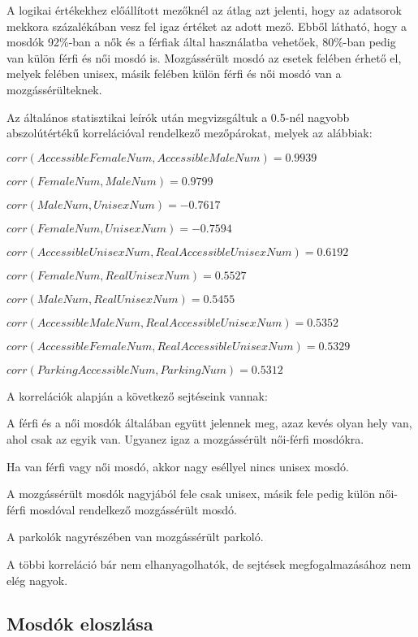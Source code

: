 	A logikai értékekhez előállított mezőknél az átlag azt jelenti, hogy az adatsorok mekkora százalékában vesz fel igaz értéket az adott mező. Ebből látható, hogy a mosdók 92\%-ban a nők és a férfiak által használatba vehetőek, 80\%-ban pedig van külön férfi és női mosdó is. Mozgássérült mosdó az esetek felében érhető el, melyek felében unisex, másik felében külön férfi és női mosdó van a mozgássérülteknek.\par	
	Az általános statisztikai leírók után megvizsgáltuk a 0.5-nél nagyobb abszolútértékű korrelációval rendelkező mezőpárokat, melyek az alábbiak:
	\begin{compactlist}			
		\item $corr(AccessibleFemaleNum, AccessibleMaleNum) = 0.9939$
		\item $corr(FemaleNum, MaleNum) = 0.9799$
		\item $corr(MaleNum, UnisexNum) = -0.7617$
		\item $corr(FemaleNum, UnisexNum) = -0.7594$
		\item $corr(AccessibleUnisexNum, RealAccessibleUnisexNum) = 0.6192$
		\item $corr(FemaleNum, RealUnisexNum) = 0.5527$
		\item $corr(MaleNum, RealUnisexNum) = 0.5455$
		\item $corr(AccessibleMaleNum, RealAccessibleUnisexNum) = 0.5352$
		\item $corr(AccessibleFemaleNum, RealAccessibleUnisexNum) = 0.5329$
		\item $corr(ParkingAccessibleNum, ParkingNum) = 0.5312$
	\end{compactlist}\par
	A korrelációk alapján a következő sejtéseink vannak:
	\begin{compactlist}			
		\item A férfi és a női mosdók általában együtt jelennek meg, azaz kevés olyan hely van, ahol csak az egyik van. Ugyanez igaz a mozgássérült női-férfi mosdókra.
		\item Ha van férfi vagy női mosdó, akkor nagy eséllyel nincs unisex mosdó.
		\item A mozgássérült mosdók nagyjából fele csak unisex, másik fele pedig külön női-férfi mosdóval rendelkező mozgássérült mosdó.
		\item A parkolók nagyrészében van mozgássérült parkoló.
	\end{compactlist}
	A többi korreláció bár nem elhanyagolhatók, de sejtések megfogalmazásához nem elég nagyok.
	\subsection{Mosdók eloszlása}
